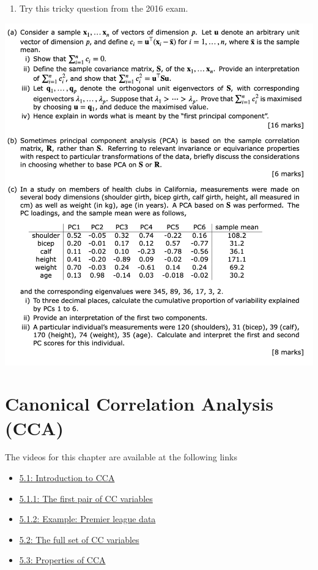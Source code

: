 \documentclass[
]{book}
\providecommand{\tightlist}{%
  \setlength{\itemsep}{0pt}\setlength{\parskip}{0pt}}
\theoremstyle{definition}
\theoremstyle{definition}
\theoremstyle{definition}
\theoremstyle{definition}
\theoremstyle{remark}
\begin{document}
\begin{enumerate}
\def\labelenumi{\arabic{enumi}.}
\setcounter{enumi}{5}
\tightlist
\item
  Try this tricky question from the 2016 exam.
\end{enumerate}

\includegraphics{PCA_Q4_2015_16.png}

\hypertarget{cca}{%
\chapter{Canonical Correlation Analysis (CCA)}\label{cca}}

The videos for this chapter are available at the following links

\begin{itemize}
\tightlist
\item
  \href{https://mediaspace.nottingham.ac.uk/media/CCA+Introduction/1_qhk7v35f}{5.1: Introduction to CCA}
\item
  \href{https://mediaspace.nottingham.ac.uk/media/CCAA+First+CC/1_yjm6kkxf}{5.1.1: The first pair of CC variables}
\item
  \href{https://mediaspace.nottingham.ac.uk/media/CCAA+Football+Example/1_r2v6924j}{5.1.2: Example: Premier league data}
\item
  \href{https://mediaspace.nottingham.ac.uk/media/CCAA+Full+Set/1_xmdoi9i6}{5.2: The full set of CC variables}
\item
  \href{https://mediaspace.nottingham.ac.uk/media/CCA\%3A\%20Properties/1_g24h27bj}{5.3: Properties of CCA}
\end{itemize}
\end{document}
